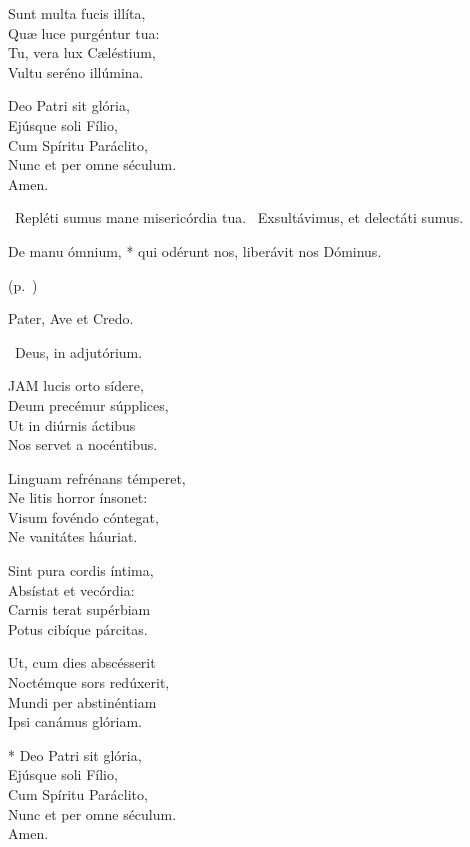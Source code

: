 Sunt multa fucis illíta,\\
Quæ luce purgéntur tua:\\
Tu, vera lux Cæléstium,\\
Vultu seréno illúmina.

Deo Patri sit glória,\\
Ejúsque soli Fílio,\\
Cum Spíritu Paráclito,\\
Nunc et per omne séculum.\\
Amen.

\V\ Repléti sumus mane misericórdia tua. \R\ Exsultávimus, et delectáti sumus.


 De manu ómnium, * qui odérunt nos, liberávit nos Dóminus.

 (p.~\pageref{feria4:precesferiales})


\sectionornament


Pater, Ave et Credo.

\V\ Deus, in adjutórium.


\lettrine[lines=2]{J}{AM} lucis orto sídere,\\
Deum precémur súpplices,\\
Ut in diúrnis áctibus\\
Nos servet a nocéntibus.

Linguam refrénans témperet,\\
Ne litis horror ínsonet:\\
Visum fovéndo cóntegat,\\
Ne vanitátes háuriat.

Sint pura cordis íntima,\\
Absístat et vecórdia:\\
Carnis terat supérbiam\\
Potus cibíque párcitas.

Ut, cum dies abscésserit\\
Noctémque sors redúxerit,\\
Mundi per abstinéntiam\\
Ipsi canámus glóriam.

* Deo Patri sit glória,\\
Ejúsque soli Fílio,\\
Cum Spíritu Paráclito,\\
Nunc et per omne séculum.\\
Amen.

